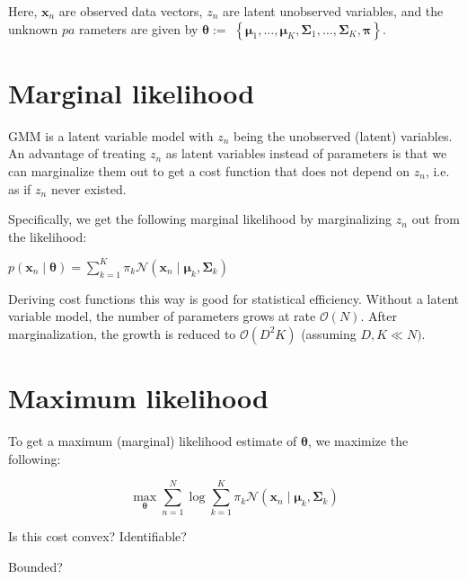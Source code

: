 Here, $\mathbf{x}_{n}$ are observed data vectors, $z_{n}$ are latent unobserved variables, and the unknown $p a$ rameters are given by $\boldsymbol{\theta}:=$ $\left\{\boldsymbol{\mu}_{1}, \ldots, \boldsymbol{\mu}_{K}, \boldsymbol{\Sigma}_{1}, \ldots, \boldsymbol{\Sigma}_{K}, \boldsymbol{\pi}\right\}$.

\section*{Marginal likelihood}
GMM is a latent variable model with $z_{n}$ being the unobserved (latent) variables. An advantage of treating $z_{n}$ as latent variables instead of parameters is that we can marginalize them out to get a cost function that does not depend on $z_{n}$, i.e. as if $z_{n}$ never existed.

Specifically, we get the following marginal likelihood by marginalizing $z_{n}$ out from the likelihood:

$p\left(\mathbf{x}_{n} \mid \boldsymbol{\theta}\right)=\sum_{k=1}^{K} \pi_{k} \mathcal{N}\left(\mathbf{x}_{n} \mid \boldsymbol{\mu}_{k}, \boldsymbol{\Sigma}_{k}\right)$


Deriving cost functions this way is good for statistical efficiency. Without a latent variable model, the number of parameters grows at rate $\mathcal{O}(N)$. After marginalization, the growth is reduced to $\mathcal{O}\left(D^{2} K\right)$ (assuming $D, K \ll N)$.

\section*{Maximum likelihood}
To get a maximum (marginal) likelihood estimate of $\boldsymbol{\theta}$, we maximize the following:

$$
\max _{\boldsymbol{\theta}} \sum_{n=1}^{N} \log \sum_{k=1}^{K} \pi_{k} \mathcal{N}\left(\mathbf{x}_{n} \mid \boldsymbol{\mu}_{k}, \boldsymbol{\Sigma}_{k}\right)
$$

Is this cost convex? Identifiable?

Bounded?

